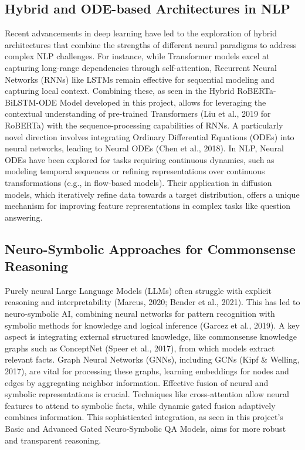 \documentclass[10.5pt]{article}
\begin{document}
\subsection{Hybrid and ODE-based Architectures in NLP}
Recent advancements in deep learning have led to the exploration of hybrid architectures that combine the strengths of different neural paradigms to address complex NLP challenges. For instance, while Transformer models excel at capturing long-range dependencies through self-attention, Recurrent Neural Networks (RNNs) like LSTMs remain effective for sequential modeling and capturing local context. Combining these, as seen in the Hybrid RoBERTa-BiLSTM-ODE Model developed in this project, allows for leveraging the contextual understanding of pre-trained Transformers (Liu et al., 2019 for RoBERTa) with the sequence-processing capabilities of RNNs.
A particularly novel direction involves integrating Ordinary Differential Equations (ODEs) into neural networks, leading to Neural ODEs (Chen et al., 2018). In NLP, Neural ODEs have been explored for tasks requiring continuous dynamics, such as modeling temporal sequences or refining representations over continuous transformations (e.g., in flow-based models). Their application in diffusion models, which iteratively refine data towards a target distribution, offers a unique mechanism for improving feature representations in complex tasks like question answering.

\subsection{Neuro-Symbolic Approaches for Commonsense Reasoning}
Purely neural Large Language Models (LLMs) often struggle with explicit reasoning and interpretability (Marcus, 2020; Bender et al., 2021). This has led to neuro-symbolic AI, combining neural networks for pattern recognition with symbolic methods for knowledge and logical inference (Garcez et al., 2019). A key aspect is integrating external structured knowledge, like commonsense knowledge graphs such as ConceptNet (Speer et al., 2017), from which models extract relevant facts. Graph Neural Networks (GNNs), including GCNs (Kipf \& Welling, 2017), are vital for processing these graphs, learning embeddings for nodes and edges by aggregating neighbor information.
Effective fusion of neural and symbolic representations is crucial. Techniques like cross-attention allow neural features to attend to symbolic facts, while dynamic gated fusion adaptively combines information. This sophisticated integration, as seen in this project's Basic and Advanced Gated Neuro-Symbolic QA Models, aims for more robust and transparent reasoning.
\end{document}
